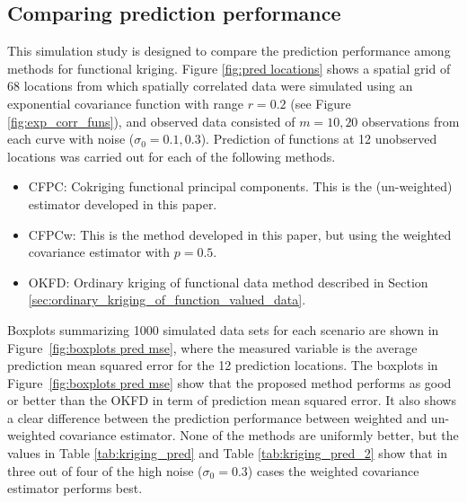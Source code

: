 
\subsection{Comparing prediction performance} %
\label{sub:comparing_prediction_performance}
This simulation study is designed to compare the prediction performance among methods for functional kriging. Figure \ref{fig:pred locations} shows a spatial grid of 68 locations from which spatially correlated data were simulated using an exponential covariance function with range $r = 0.2$ (see Figure \ref{fig:exp_corr_funs}), and observed data consisted of $m = 10, 20$ observations from each curve with noise ($\sigma_0=0.1, 0.3$). Prediction of functions at 12 unobserved locations was carried out for each of the following methods.
\begin{itemize}
	\item CFPC: Cokriging functional principal components. This is the (un-weighted) estimator developed in this paper.
	\item CFPCw: This is the method developed in this paper, but using the weighted covariance estimator with $p=0.5$.
	\item OKFD: Ordinary kriging of functional data method described in Section \ref{sec:ordinary_kriging_of_function_valued_data}.
\end{itemize}
Boxplots summarizing 1000 simulated data sets for each scenario are shown in Figure~\ref{fig:boxplots pred mse}, where the measured variable is the average prediction mean squared error for the 12 prediction locations. The boxplots in Figure~\ref{fig:boxplots pred mse} show that the proposed method performs as good or better than the OKFD in term of prediction mean squared error. It also shows a clear difference between the prediction performance between weighted and un-weighted covariance estimator. None of the methods are uniformly better, but the values in Table \ref{tab:kriging_pred} and Table \ref{tab:kriging_pred_2} show that in three out of four of the high noise ($\sigma_0 = 0.3$) cases the weighted covariance estimator performs best.  
 

